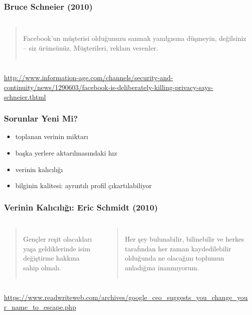 \documentclass[dvipsnames]{beamer}
\theoremstyle{definition}
\theoremstyle{example}
\theoremstyle{plain}
\begin{document}
\begin{frame}
  \frametitle{Bruce Schneier (2010)}

  \begin{columns}

  \begin{quote}
    Facebook'un müşterisi olduğunuzu sanmak yanılgısına düşmeyin, değilsiniz
    -- siz ürünsünüz. Müşterileri, reklam verenler.
  \end{quote}
  \end{columns}

  \medskip
  \tiny{\url{http://www.information-age.com/channels/security-and-continuity/news/1290603/facebook-is-deliberately-killing-privacy-says-schneier.thtml}}
\end{frame}

\begin{frame}
  \frametitle{Sorunlar Yeni Mi?}

  \begin{itemize}
    \item toplanan verinin miktarı
    \item başka yerlere aktarılmasındaki hız
    \item verinin kalıcılığı
    \item bilginin kalitesi: ayrıntılı profil çıkartılabiliyor
  \end{itemize}
\end{frame}

\begin{frame}
  \frametitle{Verinin Kalıcılığı: Eric Schmidt (2010)}

  \begin{columns}

    \begin{quote}
      Gençler reşit olacakları yaşa geldiklerinde isim değiştirme hakkına sahip olmalı.
    \end{quote}

    \pause
    \begin{quote}
      Her şey bulunabilir, bilinebilir ve herkes tarafından her zaman
      kaydedilebilir olduğunda ne olacağını toplumun anladığına inanmıyorum.
    \end{quote}
  \end{columns}

  \medskip
  \tiny{\url{https://www.readwriteweb.com/archives/google_ceo_suggests_you_change_your_name_to_escape.php}}
\end{frame}
\end{document}
